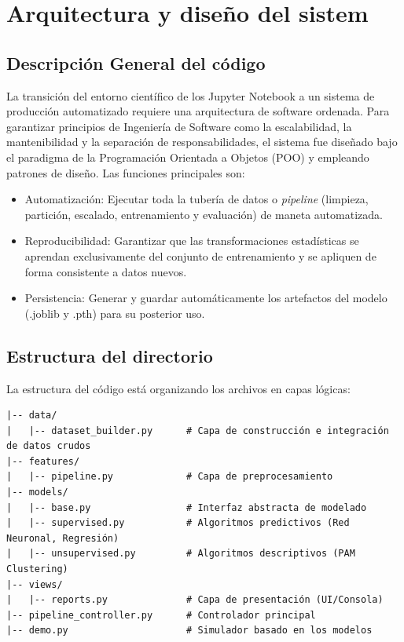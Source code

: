 \section{Arquitectura y diseño del sistem}

\subsection{Descripción General del código}

La transición del entorno científico de los Jupyter Notebook a un sistema de producción automatizado requiere una arquitectura de software ordenada. Para garantizar principios de Ingeniería de Software como la escalabilidad, la mantenibilidad y la separación de responsabilidades, el sistema fue diseñado bajo el paradigma de la Programación Orientada a Objetos (POO) y empleando patrones de diseño. Las funciones principales son:

\begin{itemize}
	\item Automatización: Ejecutar toda la tubería de datos o \emph{pipeline} (limpieza, partición, escalado, entrenamiento y evaluación) de maneta automatizada.
	\item Reproducibilidad: Garantizar que las transformaciones estadísticas se aprendan exclusivamente del conjunto de entrenamiento y se apliquen de forma consistente a datos nuevos. 
	\item Persistencia: Generar y guardar automáticamente los artefactos del modelo (.joblib y .pth) para su posterior uso.
\end{itemize}

\subsection{Estructura del directorio}

La estructura del código está organizando los archivos en capas lógicas:

\begin{verbatim}
|-- data/
|   |-- dataset_builder.py      # Capa de construcción e integración de datos crudos
|-- features/
|   |-- pipeline.py             # Capa de preprocesamiento
|-- models/
|   |-- base.py                 # Interfaz abstracta de modelado
|   |-- supervised.py           # Algoritmos predictivos (Red Neuronal, Regresión)
|   |-- unsupervised.py         # Algoritmos descriptivos (PAM Clustering)
|-- views/
|   |-- reports.py              # Capa de presentación (UI/Consola)
|-- pipeline_controller.py      # Controlador principal
|-- demo.py                     # Simulador basado en los modelos
\end{verbatim}

